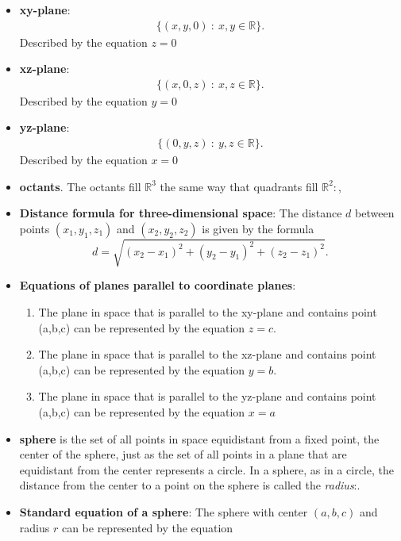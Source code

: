 \documentclass{report}
\begin{document}
\begin{itemize}
    \item \textbf{xy-plane}: 
        \begin{align*}
            \{(x,y,0)\ :\ x,y \in \mathbb{R}\}
        .\end{align*}
        Described by the equation $z=0$
    \item \textbf{xz-plane}:
        \begin{align*}
            \{(x,0,z)\ :\ x,z \in \mathbb{R}\}
        .\end{align*}
        Described by the equation $y=0$
    \item \textbf{yz-plane}:
        \begin{align*}
            \{(0,y,z)\ :\ y,z \in \mathbb{R}\}
        .\end{align*}
        Described by the equation $x=0$
    \item \textbf{octants}. The octants fill  $\mathbb{R}^{3}$ the same way that quadrants fill  $\mathbb{R}^{2}:$,
    \item \textbf{Distance formula for three-dimensional space}:
        The distance $d$ between points $(x_1, y_1, z_1)$ and $(x_2, y_2, z_2)$ is given by the formula
        \[
            d = \sqrt{(x_2 - x_1)^2 + (y_2 - y_1)^2 + (z_2 - z_1)^2}.
        \]
    \item \textbf{Equations of planes parallel to coordinate planes}:
        \begin{enumerate}
            \item The plane in space that is parallel to the xy-plane and contains point  (a,b,c) can be represented by the equation $z=c$.
            \item The plane in space that is parallel to the xz-plane and contains point  (a,b,c) can be represented by the equation  $y=b$.
            \item The plane in space that is parallel to the yz-plane and contains point  (a,b,c) can be represented by the equation  $x=a$
        \end{enumerate}
    \item \textbf{sphere} is the set of all points in space equidistant from a fixed point, the center of the sphere, just as the set of all points in a plane that are equidistant from the center represents a circle. In a sphere, as in a circle, the distance from the center to a point on the sphere is called the \textit{radius}:.
    \item \textbf{Standard equation of a sphere}:
        The sphere with center $(a,b,c)$ and radius $r$ can be represented by the equation

\end{itemize}
\end{document}
